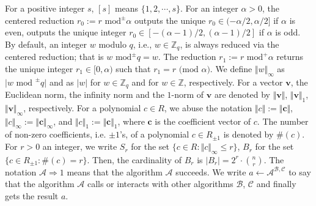 \documentclass[conference]{IEEEtran}
\begin{document}
	For a positive integer $s$, $[s]$ means $\{1, 2, \cdots, s\}$. For an integer $\alpha>0$, the centered reduction $r_0:=r \text{ mod}^{\pm} \alpha$ outputs the unique $r_0 \in (-\alpha/2, \alpha/2]$ if $\alpha$ is even, outputs the unique integer $r_0 \in [-(\alpha-1)/2, (\alpha-1)/2]$ if $\alpha$ is odd. By default, an integer $w$ modulo $q$, i.e., $w\in \mathbb{Z}_q$, is always reduced via the centered reduction; that is $w \text{ mod}^{\pm} q=w$.   The reduction $r_1:=r \text{ mod} ^{+} \alpha$ returns the unique integer $r_1 \in [0, \alpha)$ such that $r_1=r \text{ (mod } \alpha)$. We define $\Vert w\Vert_{\infty}$ as $\vert w \text{ mod }^{\pm}q\vert$ and as $\vert w \vert$ for $w\in \mathbb{Z}_q$ and for $w\in \mathbb{Z}$, respectively. 
	For a vector $\mathbf{v}$, the Euclidean norm, the infinity norm and the $1$-norm of $\mathbf{v}$ are denoted by $\Vert \mathbf{v} \Vert$, $\Vert \mathbf{v} \Vert_1$, $\Vert \mathbf{v} \Vert_\infty$, respectively.  %
	For a polynomial $c\in R$, we abuse the notation $\Vert c\Vert:=\Vert \mathbf{c} \Vert$, $\Vert c\Vert_{\infty}:=\Vert \mathbf{c} \Vert_{\infty}$, and $\Vert c\Vert_{1}:=\Vert \mathbf{c} \Vert_{1}$, where $\mathbf{c}$ is the coefficient vector of $c$.
	The number of non-zero coefficients, i.e. $\pm 1$'s,  of a polynomial  $c \in R_{\pm 1}$ is denoted by $\#(c)$.
	For $r>0$ an integer, we write $S_{r}$ for the set $\{c\in R: \Vert c\Vert_{\infty} \leq r \}$, $B_r$ for the set $\{ c\in R_{\pm 1}: \#(c)=r \}$. Then, the cardinality of $B_r$ is $\vert B_r\vert=2^{r}\cdot$$ {n}\choose{r}$. The notation $\mathcal{A}\Rightarrow 1$ means that the algorithm $\mathcal{A}$ succeeds. We write $a \leftarrow \mathcal{A}^{\mathcal{B}, \mathcal{C}}$ to say that the algorithm $\mathcal{A}$ calls or interacts with other algorithms $\mathcal{B}$, $\mathcal{C}$ and finally gets the result $a$. 
	
\end{document}
